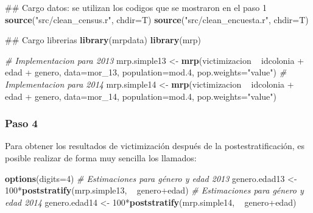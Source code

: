 \documentclass[]{article}
\newenvironment{Shaded}{\begin{snugshade}}{\end{snugshade}}
\newcommand{\KeywordTok}[1]{\textcolor[rgb]{0.13,0.29,0.53}{\textbf{{#1}}}}
\newcommand{\DataTypeTok}[1]{\textcolor[rgb]{0.13,0.29,0.53}{{#1}}}
\newcommand{\DecValTok}[1]{\textcolor[rgb]{0.00,0.00,0.81}{{#1}}}
\newcommand{\FloatTok}[1]{\textcolor[rgb]{0.00,0.00,0.81}{{#1}}}
\newcommand{\StringTok}[1]{\textcolor[rgb]{0.31,0.60,0.02}{{#1}}}
\newcommand{\CommentTok}[1]{\textcolor[rgb]{0.56,0.35,0.01}{\textit{{#1}}}}
\newcommand{\NormalTok}[1]{{#1}}
\begin{document}
\begin{Shaded}
\begin{Highlighting}[]
\NormalTok{## Cargo datos: se utilizan los codigos que se mostraron en el paso 1}
\KeywordTok{source}\NormalTok{(}\StringTok{"src/clean_census.r"}\NormalTok{, }\DataTypeTok{chdir=}\NormalTok{T)}
\KeywordTok{source}\NormalTok{(}\StringTok{"src/clean_encuesta.r"}\NormalTok{, }\DataTypeTok{chdir=}\NormalTok{T)}

\NormalTok{## Cargo librerias}
\KeywordTok{library}\NormalTok{(mrpdata)}
\KeywordTok{library}\NormalTok{(mrp)}

\CommentTok{# Implementacion para 2013}
\NormalTok{mrp.simple13 <-}\StringTok{ }\KeywordTok{mrp}\NormalTok{(victimizacion ~}\StringTok{ }\NormalTok{idcolonia +}\StringTok{ }\NormalTok{edad +}\StringTok{ }\NormalTok{genero,}
                  \DataTypeTok{data=}\NormalTok{mor_13,}
                  \DataTypeTok{population=}\NormalTok{mod}\FloatTok{.4}\NormalTok{,}
                  \DataTypeTok{pop.weights=}\StringTok{"value"}\NormalTok{)}
\CommentTok{# Implementacion para 2014}
\NormalTok{mrp.simple14 <-}\StringTok{ }\KeywordTok{mrp}\NormalTok{(victimizacion ~}\StringTok{ }\NormalTok{idcolonia +}\StringTok{ }\NormalTok{edad +}\StringTok{ }\NormalTok{genero,}
                    \DataTypeTok{data=}\NormalTok{mor_14,}
                    \DataTypeTok{population=}\NormalTok{mod}\FloatTok{.4}\NormalTok{,}
                    \DataTypeTok{pop.weights=}\StringTok{"value"}\NormalTok{)}
\end{Highlighting}
\end{Shaded}

\subsubsection{Paso 4}\label{paso-4}

Para obtener los resultados de victimización después de la
postestratificación, es posible realizar de forma muy sencilla los
llamados:

\begin{Shaded}
\begin{Highlighting}[]
\KeywordTok{options}\NormalTok{(}\DataTypeTok{digits=}\DecValTok{4}\NormalTok{)}
\CommentTok{# Estimaciones para género y edad 2013}
\NormalTok{genero.edad13 <-}\StringTok{ }\DecValTok{100}\NormalTok{*}\KeywordTok{poststratify}\NormalTok{(mrp.simple13, ~}\StringTok{ }\NormalTok{genero+edad)}
\CommentTok{# Estimaciones para género y edad 2014}
\NormalTok{genero.edad14 <-}\StringTok{ }\DecValTok{100}\NormalTok{*}\KeywordTok{poststratify}\NormalTok{(mrp.simple14, ~}\StringTok{ }\NormalTok{genero+edad)}
\end{Highlighting}
\end{Shaded}
\end{document}
